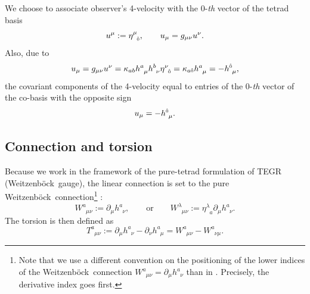 \documentclass[
10pt, %
a4paper, %
oneside, %
twocolumn,
headinclude,footinclude, %
BCOR5mm, %
]{scrartcl}
\newcommand{\pd}[1]{\partial_{#1}}
\newcommand{\mg}[1]{\kappa_{#1}}			%
\newcommand{\tetrsymbol}{h}
\newcommand{\itetrsymbol}{\eta}
\newcommand{\itetr}[2]{\itetrsymbol^{#1}_{\phantom{#1}#2}}
\newcommand{\tetr}[2]{\tetrsymbol^{#1}_{\phantom{#1}#2}}
\newcommand{\D}[1]{\partial_{#1}} %
\newcommand{\Tors}[2]{T^{#1}_{\phantom{#1}#2}}
\newcommand{\w}[2]{W^{#1}_{\phantom{#1}#2}}
\newcommand{\We}{Weitzenb\"ock}
\newcommand{\KD}[2]{\delta^{#1}_{\ #2}}
\newcommand{\indalg}[1]{\hat{\mathsmaller{#1}}}
\begin{document}
	We choose to associate observer's 4-velocity with the $ 0 $-\textit{th} vector of the tetrad basis 
	\begin{equation}\label{eqn.4v}
		u^\mu := \itetr{\mu}{\indalg{0}}, \qquad u_\mu = g_{\mu\nu}u^\nu.
	\end{equation}
	Also, due to
	\begin{equation}
		u_\mu = g_{\mu\nu} u^\nu = \mg{ab}\tetr{a}{\mu}\tetr{b}{\nu}\itetr{\nu}{\indalg{0}} = 
		\mg{a\indalg{0}}\tetr{a}{\mu} = -\tetr{\indalg{0}}{\mu},
	\end{equation}\label{eqn.4v.cov}
	the covariant components of the 4-velocity equal to entries of the $ 0 $-\textit{th} vector of 
	the 
	co-basis with the opposite sign
	\begin{equation}
		u_\mu = -\tetr{\indalg{0}}{\mu}.
	\end{equation}
	
	
	
	
	\subsection{Connection and torsion}
	
	Because we work in the framework of the pure-tetrad formulation of TEGR
	(\We\ gauge), the linear connection is set to the pure \We\
	connection\footnote{Note that we use a different convention on the
	positioning of the lower indices of the \We\ connection $ \w{a}{\mu\nu} =
	\pd{\mu}\tetr{a}{\nu} $ than in \cite{AldrovandiPereiraBook}. Precisely, the
	derivative index goes first.}
	\cite{AldrovandiPereiraBook,KleinertMultivalued}: 
	\begin{equation}\label{eqn.We}
		\w{a}{\mu\nu} := \pd{\mu}\tetr{a}{\nu}, 
		\qquad
		\text{or}
		\qquad
		\w{\lambda}{\mu\nu} := \itetr{\lambda}{a}\pd{\mu}\tetr{a}{\nu}.
	\end{equation}
	The torsion is then defined as
	\begin{equation}\label{eqn.def.tors}
		\Tors{a}{\mu\nu}:=\D{\mu}\tetr{a}{\nu} - \D{\nu}\tetr{a}{\mu} = 
		\w{a}{\mu\nu} - \w{a}{\nu\mu}.
	\end{equation}
	
\end{document}
